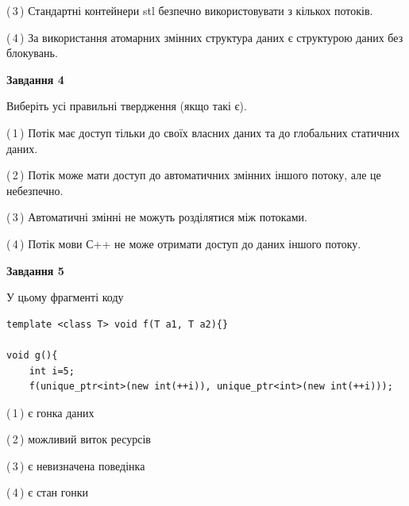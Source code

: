 \documentclass[12pt, ukrainian]{article}
\begin{document}
\begin {large}
{(\,3\,) Стандартні контейнери stl безпечно використовувати з кількох потоків.%

(\,4\,) За використання атомарних змінних структура даних є структурою даних без блокувань.%



\begin{center}
\textbf{Завдання 4}
\end{center}
Виберіть усі правильні твердження (якщо такі є).\par
\vspace{2mm}

(\,1\,) Потік має доступ тільки до своїх власних даних та до глобальних статичних даних.%

(\,2\,) Потік може мати доступ до автоматичних змінних іншого потоку, але це небезпечно.%

(\,3\,) Автоматичні змінні не можуть розділятися між потоками.%

(\,4\,) Потік мови С++ не може отримати доступ до даних іншого потоку.%



\begin{center}
\textbf{Завдання 5}
\end{center}
У цьому фрагменті коду
\begin{verbatim}
template <class T> void f(T a1, T a2){}

void g(){
    int i=5;
    f(unique_ptr<int>(new int(++i)), unique_ptr<int>(new int(++i)));
\end{verbatim}

(\,1\,) є гонка даних%

(\,2\,) можливий виток ресурсів%

(\,3\,) є невизначена поведінка%

(\,4\,) є стан гонки%


}
\end {large}
\end{document}
